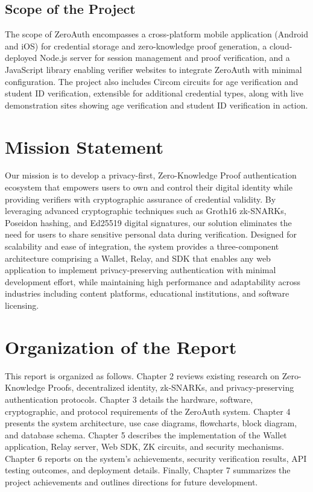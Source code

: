 \subsection{Scope of the Project}

The scope of ZeroAuth encompasses a cross-platform mobile application (Android and iOS) for credential storage and zero-knowledge proof generation, a cloud-deployed Node.js server for session management and proof verification, and a JavaScript library enabling verifier websites to integrate ZeroAuth with minimal configuration. The project also includes Circom circuits for age verification and student ID verification, extensible for additional credential types, along with live demonstration sites showing age verification and student ID verification in action.

\section{Mission Statement}

Our mission is to develop a privacy-first, Zero-Knowledge Proof authentication ecosystem that empowers users to own and control their digital identity while providing verifiers with cryptographic assurance of credential validity. By leveraging advanced cryptographic techniques such as Groth16 zk-SNARKs, Poseidon hashing, and Ed25519 digital signatures, our solution eliminates the need for users to share sensitive personal data during verification. Designed for scalability and ease of integration, the system provides a three-component architecture comprising a Wallet, Relay, and SDK that enables any web application to implement privacy-preserving authentication with minimal development effort, while maintaining high performance and adaptability across industries including content platforms, educational institutions, and software licensing.

\section{Organization of the Report}

This report is organized as follows. Chapter 2 reviews existing research on Zero-Knowledge Proofs, decentralized identity, zk-SNARKs, and privacy-preserving authentication protocols. Chapter 3 details the hardware, software, cryptographic, and protocol requirements of the ZeroAuth system. Chapter 4 presents the system architecture, use case diagrams, flowcharts, block diagram, and database schema. Chapter 5 describes the implementation of the Wallet application, Relay server, Web SDK, ZK circuits, and security mechanisms. Chapter 6 reports on the system's achievements, security verification results, API testing outcomes, and deployment details. Finally, Chapter 7 summarizes the project achievements and outlines directions for future development.

